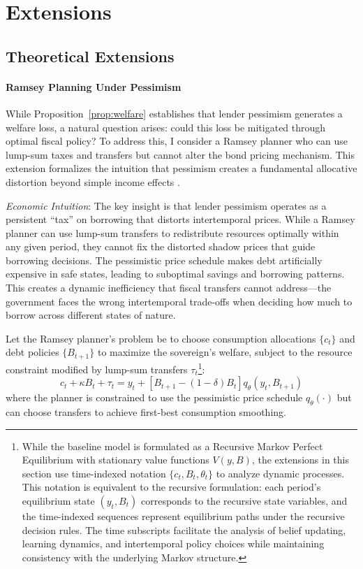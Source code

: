 \documentclass[12pt]{article}
\theoremstyle{plain}
\begin{document}
\section{Extensions}

\subsection{Theoretical Extensions}

\paragraph{Ramsey Planning Under Pessimism}\label{sec:ramsey}

While Proposition~\ref{prop:welfare} establishes that lender pessimism
generates a welfare loss, a natural question arises: could this loss be
mitigated through optimal fiscal policy? To address this, I consider a Ramsey
planner \citep{LucasStokey1983} who can use lump-sum taxes and transfers but
cannot alter the bond pricing mechanism. This extension formalizes the
intuition that pessimism creates a fundamental allocative distortion beyond
simple income effects \citep{ChariKehoe1999}.

\textit{Economic Intuition}: The key insight is that lender pessimism operates as a persistent ``tax'' on borrowing that distorts intertemporal prices. While a Ramsey planner can use lump-sum transfers to redistribute resources optimally within any given period, they cannot fix the distorted shadow prices that guide borrowing decisions. The pessimistic price schedule makes debt artificially expensive in safe states, leading to suboptimal savings and borrowing patterns. This creates a dynamic inefficiency that fiscal transfers cannot address---the government faces the wrong intertemporal trade-offs when deciding how much to borrow across different states of nature.

Let the Ramsey planner's problem be to choose consumption allocations $\{c_t\}$
and debt policies $\{B_{t+1}\}$ to maximize the sovereign's welfare, subject to
the resource constraint modified by lump-sum transfers $\tau_t$\footnote{While
	the baseline model is formulated as a Recursive Markov Perfect Equilibrium with
	stationary value functions $V(y,B)$, the extensions in this section use
	time-indexed notation $\{c_t, B_t, \theta_t\}$ to analyze dynamic processes.
	This notation is equivalent to the recursive formulation: each period's
	equilibrium state $(y_t, B_t)$ corresponds to the recursive state variables,
	and the time-indexed sequences represent equilibrium paths under the recursive
	decision rules. The time subscripts facilitate the analysis of belief updating,
	learning dynamics, and intertemporal policy choices while maintaining
	consistency with the underlying Markov structure.}:
\begin{equation}
	c_t + \kappa B_t + \tau_t = y_t + [B_{t+1} - (1-\delta)B_t]q_\theta(y_t, B_{t+1}) \label{eq:ramsey_constraint}
\end{equation}
where the planner is constrained to use the pessimistic price schedule $q_\theta(\cdot)$ but can choose transfers to achieve first-best consumption smoothing.
\end{document}
